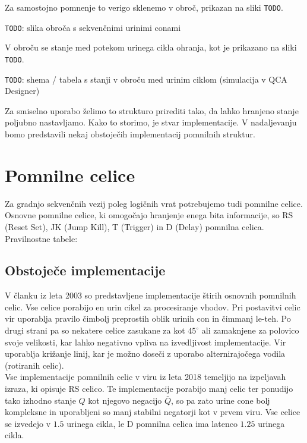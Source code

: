 \documentclass[a4paper, 11pt]{article}
\newcommand{\todo}{\textcolor{BrickRed}{\texttt{TODO}}} %
\begin{document}
Za samostojno pomnenje to verigo sklenemo v obroč, prikazan na sliki \todo.

\todo: slika obroča s sekvenčnimi urinimi conami

V obroču se stanje med potekom urinega cikla ohranja, kot je prikazano na sliki \todo.

\todo: shema / tabela s stanji v obroču med urinim ciklom (simulacija v QCA Designer)

Za smiselno uporabo želimo to strukturo prirediti tako, da lahko hranjeno stanje poljubno nastavljamo.
Kako to storimo, je stvar implementacije.
V nadaljevanju bomo predstavili nekaj obstoječih implementacij pomnilnih struktur.




\section{Pomnilne celice}
Za gradnjo sekvenčnih vezij poleg logičnih vrat potrebujemo tudi pomnilne celice. Osnovne pomnilne celice, ki omogočajo hranjenje enega bita informacije, so RS (Reset Set), JK (Jump Kill), T (Trigger) in D (Delay) pomnilna celica. \\

Pravilnostne tabele:


\subsection{Obstoječe implementacije}
V članku \cite{quantum_dot} iz leta 2003 so predstavljene implementacije štirih osnovnih pomnilnih celic. Vse celice porabijo en urin cikel za procesiranje vhodov. Pri postavitvi celic vir uporablja pravilo čimbolj preprostih oblik urinih con in čimmanj le-teh. Po drugi strani pa so nekatere celice zasukane za kot $ 45^{\circ} $ ali zamaknjene za polovico svoje velikosti, kar lahko negativno vpliva na izvedljivost implementacije. Vir uporablja križanje linij, kar je možno doseči z uporabo alternirajočega vodila (rotiranih celic). \\

Vse implementacije pomnilnih celic v viru \cite{a_novel_approach} iz leta 2018 temeljijo na izpeljavah izraza, ki opisuje RS celico. Te implementacije porabijo manj celic ter ponudijo tako izhodno stanje $Q$ kot njegovo negacijo $\bar{Q}$, so pa zato urine cone bolj kompleksne in uporabljeni so manj stabilni negatorji kot v prvem viru. Vse celice se izvedejo v $1.5$ urinega cikla, le D pomnilna celica ima latenco $1.25$ urinega cikla.
\end{document}
